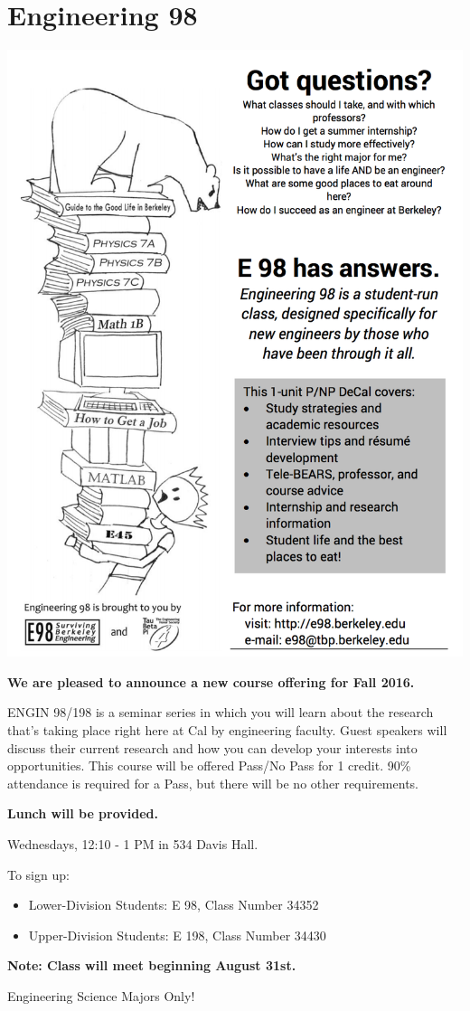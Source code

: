 \chapter*{Engineering 98}

\includegraphics{resources/e98-flyer.png}

\textbf{We are pleased to announce a new course offering for Fall 2016.}
 
ENGIN 98/198 is a seminar series in which you will learn about the research that's taking place right here at Cal by engineering faculty. Guest speakers will discuss their current research and how you can develop your interests into opportunities. This course will be offered Pass/No Pass for 1 credit. 90\% attendance is required for a Pass, but there will be no other requirements.
 
\textbf{Lunch will be provided.}
 
Wednesdays, 12:10 - 1 PM in 534 Davis Hall.
 
To sign up:

\begin{itemize}
  \item Lower-Division Students: E 98, Class Number 34352
  \item Upper-Division Students: E 198, Class Number 34430
\end{itemize}

\textbf{Note: Class will meet beginning August 31st.}
 
Engineering Science Majors Only!


